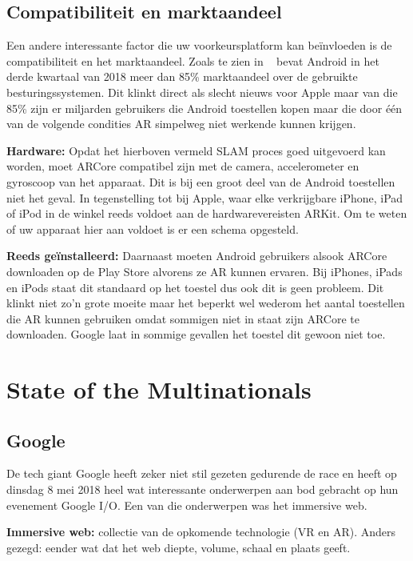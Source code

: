\subsection{Compatibiliteit en marktaandeel}

Een andere interessante factor die uw voorkeursplatform kan beïnvloeden is de compatibiliteit en het marktaandeel. Zoals te zien in ~\textcite{IDC2018} bevat Android in het derde kwartaal van 2018 meer dan 85\% marktaandeel over de gebruikte besturingssystemen. Dit klinkt direct als slecht nieuws voor Apple maar van die 85\% zijn er miljarden gebruikers die Android toestellen kopen maar die door één van de volgende condities AR simpelweg niet werkende kunnen krijgen. 

\textbf{Hardware:}
Opdat het hierboven vermeld SLAM proces goed uitgevoerd kan worden, moet ARCore compatibel zijn met de camera, accelerometer en gyroscoop van het apparaat. Dit is bij een groot deel van de Android toestellen niet het geval. In tegenstelling tot bij Apple, waar elke verkrijgbare iPhone, iPad of iPod in de winkel reeds voldoet aan de hardwarevereisten ARKit. Om te weten of uw apparaat hier aan voldoet is er een schema opgesteld. ~\autocite{GoogleDevices2019}

\textbf{Reeds geïnstalleerd:}
Daarnaast moeten Android gebruikers alsook ARCore downloaden op de Play Store alvorens ze AR kunnen ervaren. Bij iPhones, iPads en iPods staat dit standaard op het toestel dus ook dit is geen probleem. Dit klinkt niet zo'n grote moeite maar het beperkt wel wederom het aantal toestellen die AR kunnen gebruiken omdat sommigen niet in staat zijn ARCore te downloaden. Google laat in sommige gevallen het toestel dit gewoon niet toe. 
 
\section{State of the Multinationals}
\label{sec:state-of-the-multinationals}
  

\subsection{Google}
De tech giant Google heeft zeker niet stil gezeten gedurende de race en heeft op dinsdag 8 mei 2018 heel wat interessante onderwerpen aan bod gebracht op hun evenement Google I/O. Een van die onderwerpen was het immersive web.

\textbf{Immersive web:} 
collectie van de opkomende technologie (VR en AR). Anders gezegd: eender wat dat het web diepte, volume, schaal en plaats geeft.

